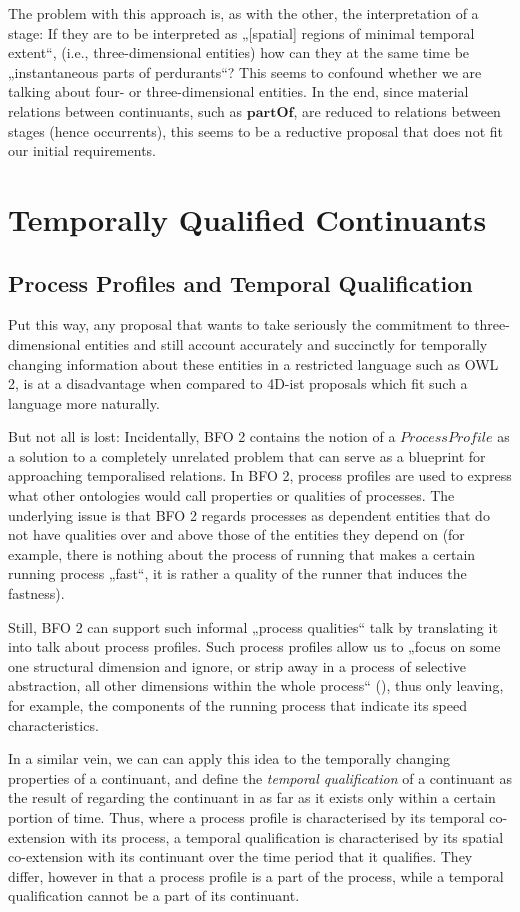 \documentclass{ao2e}
\newcommand{\mirel}[1]{\ensuremath{\mathrm{\mathbf{#1}}}}
\newcommand{\mclass}[1]{\ensuremath{\mathit{#1}}}
\begin{document}
The problem with this approach is, as with the other, the interpretation of a
stage: If they are to be interpreted as „[spatial] regions of minimal temporal
extent“, (i.e., three-dimensional entities) how can they at the same time be
„instantaneous parts of perdurants“?
This seems to confound whether we are talking about four- or three-dimensional
entities. In the end, since material relations between continuants, such as
\mirel{partOf}, are reduced to relations between stages (hence occurrents), this
seems to be a reductive proposal that does not fit our initial requirements.

\section{Temporally Qualified Continuants}
\subsection{Process Profiles and Temporal Qualification}
Put this way, any proposal that wants to take seriously the commitment to
three-dimensional entities and still account accurately and succinctly for
temporally changing information about these entities in a restricted language
such as OWL 2, is at a disadvantage when compared to 4D-ist proposals which fit
such a language more naturally. 

But not all is lost: Incidentally, BFO 2 contains the notion of a
\mclass{ProcessProfile} as a solution to a completely
unrelated problem that can serve as a blueprint for approaching temporalised
relations. In BFO 2, process profiles are used to express what other ontologies
would call properties or qualities of processes. The underlying issue is that
BFO 2 regards processes as dependent entities that do not have qualities
over and above those of the entities they depend on (for example, there is nothing about
the process of running that makes a certain running process „fast“, it is rather
a quality of the runner that induces the fastness). 

Still, BFO 2 can support such informal „process qualities“ talk by translating
it into talk about process profiles. Such process profiles allow us to „focus on some one
structural dimension and ignore, or strip away in a process of selective
abstraction, all other dimensions within the whole process“ (\cite{BFO2:ref}), thus only 
leaving, for example, the components of the running process that indicate its speed
characteristics. 

In a similar vein, we can can apply this idea to the temporally changing
properties of a continuant, and define the \emph{temporal qualification} of a
continuant as the result of regarding the continuant in as far as it exists only
within a certain portion of time. Thus, where a process profile is characterised
by its temporal co-extension with its process, a temporal qualification is
characterised by its spatial co-extension with its continuant over the time
period that it qualifies. They differ, however in that a process profile is a
part of the process, while a temporal qualification cannot be a part of its
continuant.
\end{document}
